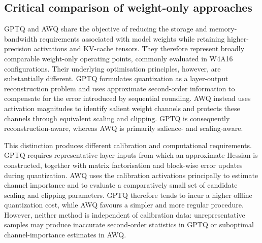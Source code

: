 \subsection{Critical comparison of weight-only approaches}
GPTQ and AWQ share the objective of reducing the storage and
memory-bandwidth requirements associated with model weights while
retaining higher-precision activations and KV-cache tensors. They
therefore represent broadly comparable weight-only operating points,
commonly evaluated in W4A16 configurations. Their underlying
optimisation principles, however, are substantially different. GPTQ
formulates quantization as a layer-output reconstruction problem and
uses approximate second-order information to compensate for the error
introduced by sequential rounding. AWQ instead uses activation
magnitudes to identify salient weight channels and protects these
channels through equivalent scaling and clipping. GPTQ is consequently
reconstruction-aware, whereas AWQ is primarily salience- and
scaling-aware.

This distinction produces different calibration and computational
requirements. GPTQ requires representative layer inputs from which an
approximate Hessian is constructed, together with matrix factorisation
and block-wise error updates during quantization. AWQ uses the
calibration activations principally to estimate channel importance and
to evaluate a comparatively small set of candidate scaling and clipping
parameters. GPTQ therefore tends to incur a higher offline quantization
cost, while AWQ favours a simpler and more regular procedure. However,
neither method is independent of calibration data: unrepresentative
samples may produce inaccurate second-order statistics in GPTQ or
suboptimal channel-importance estimates in AWQ.

